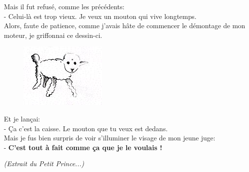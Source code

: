 \begin{multicols}{2}
  Mais il fut refusé, comme les précédents: \\
  - Celui-là est trop vieux. Je veux un mouton qui vive longtemps. \\
  Alors, faute de patience, comme j'avais hâte de commencer le démontage de mon moteur, je griffonnai ce dessin-ci.
  
  \begin{figure}[H]
    \centering
    \includegraphics[width=0.3\linewidth]{5x6-calcul-litteral/mouton2.png}
  \end{figure}

  Et je lançai: \\
  - Ça c'est la caisse. Le mouton que tu veux est dedans. \\
  Mais je fus bien surpris de voir s'illuminer le visage de mon jeune juge: \\
  - \textbf{C'est tout à fait comme ça que je le voulais ! }
\end{multicols}

\horrule{1px}


\textit{(Extrait du Petit Prince...)}

